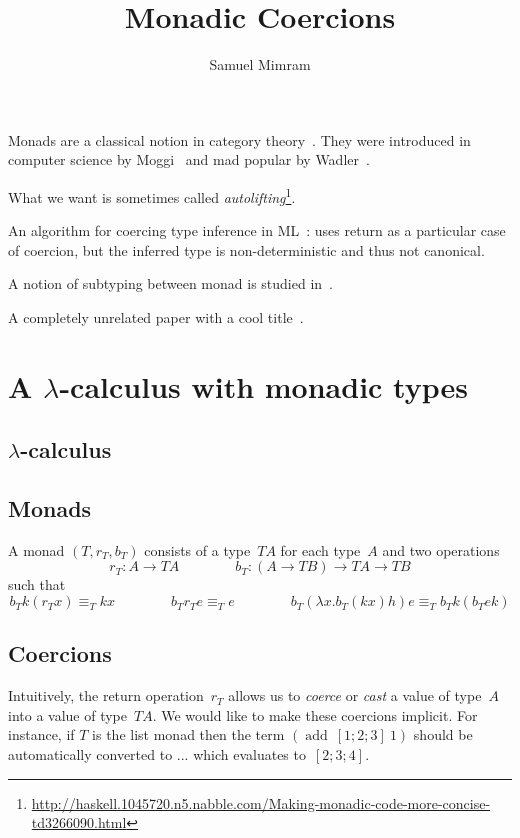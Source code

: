 \documentclass{article}
\title{Monadic Coercions}
\author{Samuel Mimram}
\newcommand{\add}{\mathop{add}}
\begin{document}
\maketitle

Monads are a classical notion in category theory~\cite{mac1998categories}. They
were introduced in computer science by Moggi~\cite{moggi2002computational} and
mad popular by Wadler~\cite{wadler1992comprehending}.

What we want is sometimes called
\emph{autolifting}\footnote{\url{http://haskell.1045720.n5.nabble.com/Making-monadic-code-more-concise-td3266090.html}}.

An algorithm for coercing type inference in ML~\cite{luo2008coercions}: uses
return as a particular case of coercion, but the inferred type is
non-deterministic and thus not canonical.

A notion of subtyping between monad is studied in~\cite{tolmach1998optimizing}.

A completely unrelated paper with a cool title~\cite{shalgi2008being}.

\section{A $\lambda$-calculus with monadic types}

\subsection{$\lambda$-calculus}

\subsection{Monads}
A monad $(T,r_T,b_T)$ consists of a type~$TA$ for each type~$A$ and two
operations
\[
r_T:A\to TA
\qquad\qquad
b_T:(A\to TB)\to TA\to TB
\]
such that
\begin{equation}
  \label{eq:monad-laws}
  b_Tk(r_T x)\equiv_T kx
  \qquad\qquad
  b_Tr_Te\equiv_T e
  \qquad\qquad
  b_T(\lambda x.b_T(kx)h)e\equiv_T b_Tk(b_T e k)
\end{equation}

\subsection{Coercions}
Intuitively, the return operation~$r_T$ allows us to \emph{coerce} or
\emph{cast} a value of type~$A$ into a value of type~$TA$. We would like to make
these coercions implicit. For instance, if $T$ is the list monad then the term
$(\add\ [1;2;3]\ 1)$ should be automatically converted to ... which evaluates
to~$[2;3;4]$.
\end{document}
